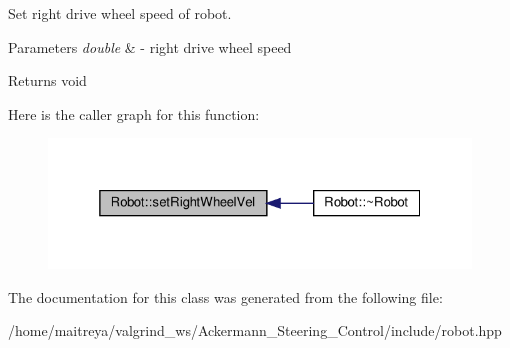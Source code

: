 Set right drive wheel speed of robot. 


\begin{DoxyParams}{Parameters}
{\em double} & -\/ right drive wheel speed \\
\hline
\end{DoxyParams}
\begin{DoxyReturn}{Returns}
void 
\end{DoxyReturn}
Here is the caller graph for this function\+:
\nopagebreak
\begin{figure}[H]
\begin{center}
\leavevmode
\includegraphics[width=325pt]{classRobot_a89e3ada15839330f45c350b67ba746f3_icgraph}
\end{center}
\end{figure}


The documentation for this class was generated from the following file\+:\begin{DoxyCompactItemize}
\item 
/home/maitreya/valgrind\+\_\+ws/\+Ackermann\+\_\+\+Steering\+\_\+\+Control/include/robot.\+hpp\end{DoxyCompactItemize}

